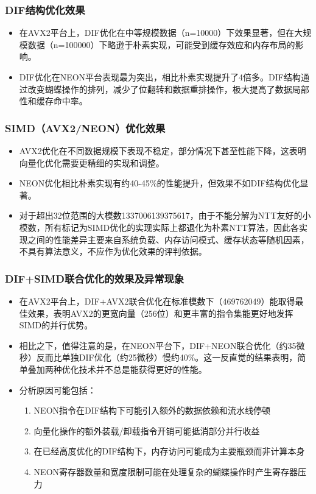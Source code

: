 \documentclass[a4paper,colorlinks=true,linkcolor=blue,urlcolor=blue,citecolor=green,bookmarks=true]{article}
\begin{document}
\subsubsection{DIF结构优化效果}
\begin{itemize}
  \item 在AVX2平台上，DIF优化在中等规模数据（n=10000）下效果显著，但在大规模数据（n=100000）下略逊于朴素实现，可能受到缓存效应和内存布局的影响。
  \item DIF优化在NEON平台表现最为突出，相比朴素实现提升了4倍多。DIF结构通过改变蝴蝶操作的排列，减少了位翻转和数据重排操作，极大提高了数据局部性和缓存命中率。
\end{itemize}

\subsubsection{SIMD（AVX2/NEON）优化效果}
\begin{itemize}
  \item AVX2优化在不同数据规模下表现不稳定，部分情况下甚至性能下降，这表明向量化优化需要更精细的实现和调整。
  \item NEON优化相比朴素实现有约40-45\%的性能提升，但效果不如DIF结构优化显著。
  \item 对于超出32位范围的大模数1337006139375617，由于不能分解为NTT友好的小模数，所有标记为SIMD优化的实现实际上都退化为朴素NTT算法，因此各实现之间的性能差异主要来自系统负载、内存访问模式、缓存状态等随机因素，不具有算法意义，不应作为优化效果的评判依据。
\end{itemize}

\subsubsection{DIF+SIMD联合优化的效果及异常现象}
\begin{itemize}
  \item 在AVX2平台上，DIF+AVX2联合优化在标准模数下（469762049）能取得最佳效果，表明AVX2的更宽向量（256位）和更丰富的指令集能更好地发挥SIMD的并行优势。
  \item 相比之下，值得注意的是，在NEON平台下，DIF+NEON联合优化（约35微秒）反而比单独DIF优化（约25微秒）慢约40\%。这一反直觉的结果表明，简单叠加两种优化技术并不总是能获得更好的性能。
  \item 分析原因可能包括：
  \begin{enumerate}
    \item NEON指令在DIF结构下可能引入额外的数据依赖和流水线停顿
    \item 向量化操作的额外装载/卸载指令开销可能抵消部分并行收益
    \item 在已经高度优化的DIF结构下，内存访问可能成为主要瓶颈而非计算本身
    \item NEON寄存器数量和宽度限制可能在处理复杂的蝴蝶操作时产生寄存器压力
  \end{enumerate}
\end{itemize}
\end{document}

